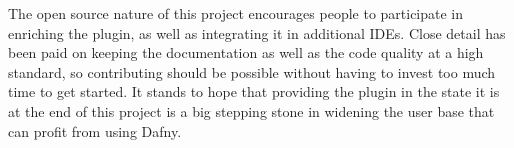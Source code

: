 The open source nature of this project encourages people to participate in enriching the plugin, as well as integrating it in additional IDEs. Close detail has been paid on keeping the documentation as well as the code quality at a high standard, so contributing should be possible without having to invest too much time to get started. It stands to hope that providing the plugin in the state it is at the end of this project is a big stepping stone in widening the user base that can profit from using Dafny. 